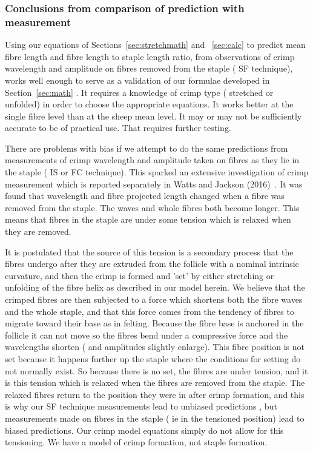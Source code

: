 \documentclass[titlepage,10pt]{article}  %
\begin{document}
\subsubsection{Conclusions from comparison of prediction with measurement}
Using our equations of Sections~\ref{sec:stretchmath} and ~\ref{sec:calc} to predict  mean fibre length and fibre length to staple length ratio, from observations of crimp wavelength and amplitude on fibres removed from the staple ( SF technique), works well enough to serve as a validation of our formulae developed in Section~\ref{sec:math} . It requires a knowledge of crimp type ( stretched or unfolded) in order to choose the appropriate equations.  It works better at the single fibre level than at the sheep mean level. It may or may not be sufficiently accurate to be of practical use. That requires further testing.

There are problems with bias if we attempt  to do the same predictions from measurements of crimp wavelength and amplitude taken on fibres as they lie in the staple ( IS or FC technique). This sparked an extensive investigation of crimp measurement which is reported separately in Watts and Jackson (2016)~\cite{watt:16}. It was found that wavelength and fibre projected length changed when a fibre was removed from the staple. The waves and whole fibres both become longer. This means that fibres in the staple are under some tension which is relaxed when they are removed.

It is postulated that the source of this tension is a secondary process that the fibres undergo after they are extruded from the follicle with a nominal intrinsic curvature, and then the crimp is formed  and 'set' by either stretching or unfolding of the fibre helix as described in our model herein. We believe that the crimped fibres are then subjected to a force which shortens both the fibre waves and the whole staple, and that this force comes from the tendency of fibres to migrate toward their base as in felting. Because the fibre base is anchored in the follicle it can not move so the fibres bend under a compressive force and the wavelengths shorten ( and amplitudes slightly enlarge). This fibre position is not set because it happens further up the staple where the conditions for setting do not normally exist. So because there is no set, the fibres are under tension, and it is this tension which is relaxed when the fibres are removed from the staple. The relaxed fibres return to the position they were in after crimp formation, and this is why our SF technique measurements lead to unbiased predictions , but measurements made on fibres in the staple ( ie in the tensioned position) lead to biased predictions. Our crimp model equations simply do not allow for this tensioning. We have a model of crimp formation, not staple formation.
\end{document}
